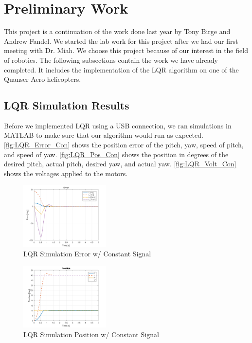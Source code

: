 \documentclass[letterpaper, 10pt, conference]{ieeeconf}
\begin{document}

\section{Preliminary Work}

This project is a continuation of the work done last year by Tony Birge and Andrew Fandel.  We started the lab work for this project after we had our first meeting with Dr. Miah.  We choose this project because of our interest in the field of robotics.  The following subsections contain the work we have already completed.  It includes the implementation of the LQR algorithm on one of the Quanser Aero helicopters.

\subsection{LQR Simulation Results} \label{sec:lqrsimresults}
Before we implemented LQR using a USB connection, we ran simulations in MATLAB to make sure that our algorithm would run as expected.  \autoref{fig:LQR_Error_Con} shows the position error of the pitch, yaw, speed of pitch, and speed of yaw.  \autoref{fig:LQR_Pos_Con} shows the position in degrees of the desired pitch, actual pitch, desired yaw, and actual yaw.  \autoref{fig:LQR_Volt_Con} shows the voltages applied to the motors.

\begin{figure}
  \centering
  \includegraphics[width=0.4\textwidth]{figs/matlab/LQR/LQR_Simulation/LQR_Error_Con}
  \caption{LQR Simulation Error w/ Constant Signal}
  \label{fig:LQR_Error_Con}
\end{figure}

\begin{figure}
  \centering
  \includegraphics[width=0.4\textwidth]{figs/matlab/LQR/LQR_Simulation/LQR_Pos_Con}
  \caption{LQR Simulation Position w/ Constant Signal}
  \label{fig:LQR_Pos_Con}
\end{figure}
\end{document}
